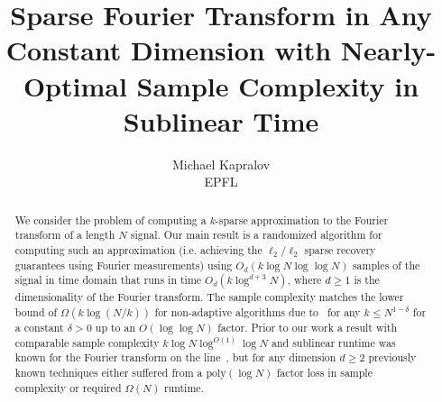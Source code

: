 \documentclass[11pt]{article}
\newcommand{\poly}{\text{poly}}
\begin{document}
\begin{titlepage}
\title{Sparse Fourier Transform in Any Constant Dimension with Nearly-Optimal Sample Complexity in Sublinear Time}
\author{Michael Kapralov\\EPFL}

\maketitle

\begin{abstract}
We consider the problem of computing a $k$-sparse approximation to the Fourier transform of a length $N$ signal. Our main result is a randomized algorithm for computing such an approximation (i.e. achieving the $\ell_2/\ell_2$ sparse recovery guarantees using Fourier measurements) using $O_d(k\log N\log\log N)$ samples of the signal in time domain that runs in time $O_d(k\log^{d+3} N)$, where $d\geq 1$ is the dimensionality of the Fourier transform. The sample complexity matches the lower bound of $\Omega(k\log (N/k))$ for non-adaptive algorithms due to~\cite{DIPW} for any $k\leq N^{1-\delta}$ for a constant $\delta>0$ up to an $O(\log\log N)$ factor. Prior to our work a result with comparable sample complexity $k\log N \log^{O(1)}\log N$ and sublinear runtime was known for the Fourier transform on the line~\cite{IKP}, but for any dimension $d\geq 2$ previously known techniques either suffered from a $\poly(\log N)$ factor loss in sample complexity or required $\Omega(N)$ runtime.
\end{abstract}
\thispagestyle{empty}
\end{titlepage}

\tableofcontents

\newpage


\newcommand{\nsq}{{[n]^d}}





\end{document}

